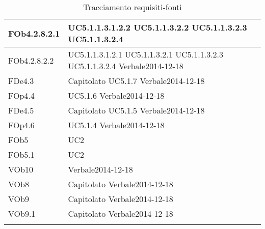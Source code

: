 \begin{longtable}{|l|p{4cm}|}
\hline
FOb4.2.8.2.1 & UC5.1.1.3.1.2.2 \linebreak  UC5.1.1.3.2.2 \linebreak  UC5.1.1.3.2.3 \linebreak  UC5.1.1.3.2.4 \linebreak  \\ 
\hline
FOb4.2.8.2.2 & UC5.1.1.3.1.2.1 \linebreak  UC5.1.1.3.2.1 \linebreak  UC5.1.1.3.2.3 \linebreak  UC5.1.1.3.2.4 \linebreak  Verbale2014-12-18 \linebreak  \\ 
\hline
FDe4.3 & Capitolato \linebreak  UC5.1.7 \linebreak  Verbale2014-12-18 \linebreak  \\ 
\hline
FOp4.4 & UC5.1.6 \linebreak  Verbale2014-12-18 \linebreak  \\ 
\hline
FDe4.5 & Capitolato \linebreak  UC5.1.5 \linebreak  Verbale2014-12-18 \linebreak  \\ 
\hline
FOp4.6 & UC5.1.4 \linebreak  Verbale2014-12-18 \linebreak  \\ 
\hline
FOb5 & UC2 \linebreak \\ 
\hline
FOb5.1 & UC2 \linebreak  \\ 
\hline
VOb10 & Verbale2014-12-18 \linebreak \\ 
\hline
VOb8 & Capitolato \linebreak Verbale2014-12-18 \linebreak \\ 
\hline
VOb9 & Capitolato \linebreak Verbale2014-12-18 \linebreak \\ 
\hline
VOb9.1 & Capitolato \linebreak  Verbale2014-12-18 \linebreak  \\ 
\hline
\caption{Tracciamento requisiti-fonti}
\end{longtable}
	
